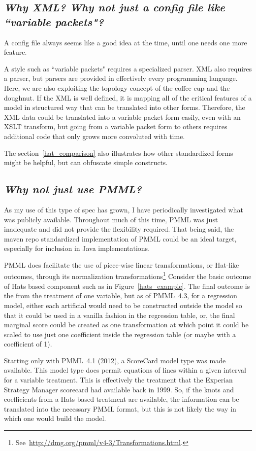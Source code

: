\documentclass[10pt]{article}
\begin{document}
\subsection{\em Why XML? Why not just a config file like ``variable packets"?} 
A config file always seems like a good idea at the time, until one needs one more feature.

A style such as ``variable packets" requires a specialized parser. XML also requires a parser, but
parsers are provided in effectively every programming language. Here, we are also exploiting the topology concept 
of the coffee cup and the doughnut.  If the XML is well defined, it is mapping all of the critical features of a
model in structured way that can be translated into other forms. Therefore, the XML data could be translated into
a variable packet form easily, even with an XSLT transform, but going from a variable packet form to others requires
additional code that only grows more convoluted with time.

The section~\ref{hat_comparison} also illustrates how other standardized forms might be helpful, but can obfuscate simple constructs.


\subsection{\em Why not just use PMML?\label{WhyNotPMML}}
As my use of this type of spec has grown, I have periodically investigated what was publicly available.  
Throughout much of this time, PMML was just inadequate and did not provide the flexibility required.  
That being said, the maven repo standardized implementation of PMML could be an ideal target, especially 
for inclusion in Java implementations.   

PMML does facilitate the use of piece-wise linear transformations, or Hat-like outcomes, through its normalization
transformations\footnote{See~\url{http://dmg.org/pmml/v4-3/Transformations.html}.}  Consider the
basic outcome of Hats based component such as in Figure~\ref{hats_example}.  The final outcome is 
the from the treatment of one variable, but as of PMML~4.3, for a regression model, either
each artificial would need to be constructed outside the model so that it could be used in a 
vanilla fashion in the regression table, or, the final marginal score could be created as one transformation
at which point it could be scaled to use just one coefficient inside the regression table (or maybe with a coefficient of 1).

Starting only with PMML~4.1 (2012), a ScoreCard model type was made available.  This model type does permit 
equations of lines within a given interval for a variable treatment.  This is effectively the treatment that
the Experian Strategy Manager scorecard had available back in 1999.  So, if the knots and coefficients 
from a Hats based treatment are available, the information can be translated into the necessary PMML format,
but this is not likely the way in which one would build the model.
\end{document}
